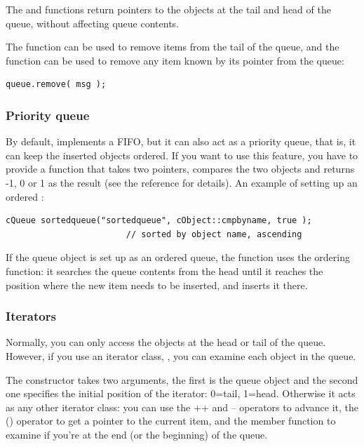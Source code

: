 The  and  functions return pointers to the objects
at the tail and head of the queue, without affecting queue contents.

The  function can be used to remove items from the
tail of the queue, and the  function can be
used to remove any item known by its pointer from the queue:

\begin{verbatim}
queue.remove( msg );
\end{verbatim}



\subsubsection{Priority queue}


By default,  implements a FIFO, but it can also act as
a priority queue, that is, it can keep the inserted objects
ordered.  If you want to use this feature, you have
to provide a function that takes two  pointers,
compares the two objects and returns -1, 0 or 1 as the result (see the
reference for details).  An example of setting up an ordered
:

\begin{verbatim}
cQueue sortedqueue("sortedqueue", cObject::cmpbyname, true );
                        // sorted by object name, ascending
\end{verbatim}


If the queue object is set up as an ordered queue, the 
function uses the ordering function: it searches the queue contents
from the head until it reaches the position where the new item
needs to be inserted, and inserts it there.


\subsubsection{Iterators}


Normally, you can only access the objects at the head or tail of the
queue. However, if you use an iterator class, ,
you can examine each object in the queue.

The  constructor takes two arguments, the first
is the queue object and the second one specifies the initial position
of the iterator: 0=tail, 1=head. Otherwise it acts as any other
{\opp} iterator class: you can use the ++ and -- operators to advance
it, the () operator to get a pointer to the current item, and the
 member function to examine if you're at the end (or the
beginning) of the queue.


